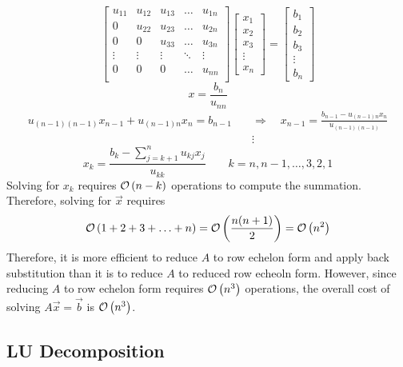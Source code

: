 \begin{equation*}
    \begin{bmatrix}  
        u_{11} & u_{12} & u_{13} & \ldots & u_{1n} \\
        0      & u_{22} & u_{23} & \ldots & u_{2n} \\
        0      & 0      & u_{33} & \ldots & u_{3n} \\
        \vdots & \vdots & \vdots & \ddots & \vdots \\
        0      & 0      & 0      & \ldots & u_{nn} \\
    \end{bmatrix}  
    \begin{bmatrix}x_1\\x_2\\x_3\\\vdots\\x_n\end{bmatrix}=
    \begin{bmatrix}b_1\\b_2\\b_3\\\vdots\\b_n\end{bmatrix}
\end{equation*}
%
\begin{equation*}
  x = \frac{b_n}{u_{nn}}
\end{equation*}
%  
\begin{align*}
  u_{(n-1)(n-1)} x_{n-1} + u_{(n-1)n} x_n = b_{n-1} \quad &\Rightarrow \quad
  x_{n-1} = \frac{b_{n-1}-u_{(n-1)n}x_n}{u_{(n-1)(n-1)}}\\&\vdots
\end{align*}
%
\begin{equation*}
  x_k  = \frac{b_k - \sum_{j=k+1}^n u_{kj}x_j}{u_{kk}} \qquad k=n, n-1, \ldots, 3, 2, 1
\end{equation*}
%
Solving for $x_k$ requires $\mathcal{O}\left(n-k\right)$ operations to compute the summation. 
Therefore, solving for $\Vec{x}$ requires
%
\begin{equation*}
	\mathcal{O}\left(1+2+3+\ldots+n\right) = \mathcal{O}\left(\frac{n(n+1)}{2}\right) = \mathcal{O}\left(n^2\right)
\end{equation*}
%
Therefore, it is more efficient to reduce $A$ to row echelon form and apply back
substitution than it is to reduce $A$ to reduced row echeoln form. However,
since reducing $A$ to row echelon form requires $\mathcal{O}\left(n^3\right)$ operations, the
overall cost of solving $A\Vec{x}=\Vec{b}$ is $\mathcal{O}\left(n^3\right)$.

\subsection{LU Decomposition}

